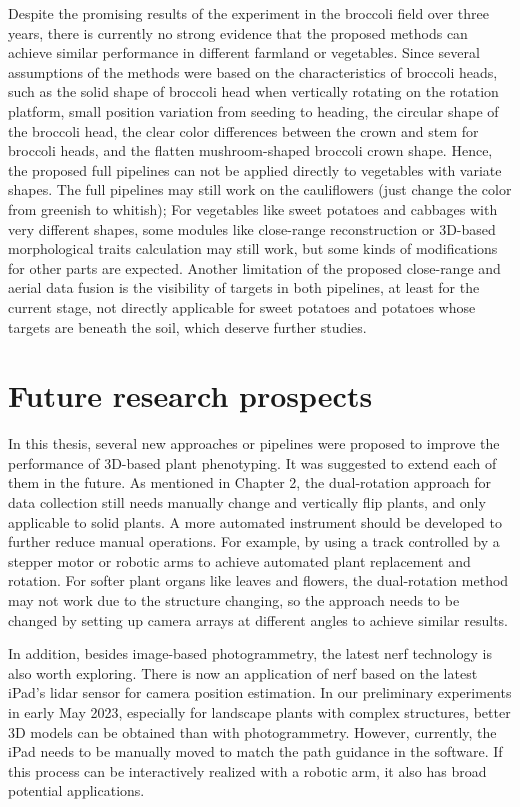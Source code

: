 Despite the promising results of the experiment in the broccoli field over three years, there is currently no strong evidence that the proposed methods can achieve similar performance in different farmland or vegetables. Since several assumptions of the methods were based on the characteristics of broccoli heads, such as the solid shape of broccoli head when vertically rotating on the rotation platform, small position variation from seeding to heading, the circular shape of the broccoli head, the clear color differences between the crown and stem for broccoli heads, and the flatten mushroom-shaped broccoli crown shape. Hence, the proposed full pipelines can not be applied directly to vegetables with variate shapes. The full pipelines may still work on the cauliflowers (just change the color from greenish to whitish); For vegetables like sweet potatoes and cabbages with very different shapes, some modules like close-range reconstruction or 3D-based morphological traits calculation may still work, but some kinds of modifications for other parts are expected. Another limitation of the proposed close-range and aerial data fusion is the visibility of targets in both pipelines, at least for the current stage, not directly applicable for sweet potatoes and potatoes whose targets are beneath the soil, which deserve further studies.

\section{Future research prospects}

In this thesis, several new approaches or pipelines were proposed to improve the performance of 3D-based plant phenotyping. It was suggested to extend each of them in the future. As mentioned in Chapter 2, the dual-rotation approach for data collection still needs manually change and vertically flip plants, and only applicable to solid plants. A more automated instrument should be developed to further reduce manual operations. For example, by using a track controlled by a stepper motor or robotic arms to achieve automated plant replacement and rotation. For softer plant organs like leaves and flowers, the dual-rotation method may not work due to the structure changing, so the approach needs to be changed by setting up camera arrays at different angles to achieve similar results.

In addition, besides image-based photogrammetry, the latest \gls{nerf} technology is also worth exploring. There is now an application of \gls{nerf} based on the latest iPad's \gls{lidar} sensor for camera position estimation. In our preliminary experiments in early May 2023, especially for landscape plants with complex structures, better 3D models can be obtained than with photogrammetry. However, currently, the iPad needs to be manually moved to match the path guidance in the software. If this process can be interactively realized with a robotic arm, it also has broad potential applications.

